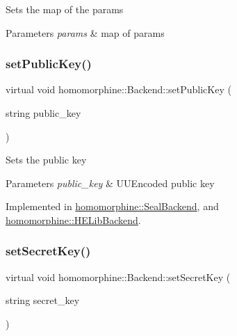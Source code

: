 Sets the map of the params


\begin{DoxyParams}{Parameters}
{\em params} & map of params \\
\hline
\end{DoxyParams}
\mbox{\label{classhomomorphine_1_1_backend_a7c1236495e4aa6481871852edfff327a}} 
\subsubsection{\texorpdfstring{setPublicKey()}{setPublicKey()}}
{\footnotesize\ttfamily virtual void homomorphine\+::\+Backend\+::set\+Public\+Key (\begin{DoxyParamCaption}\item[{string}]{public\+\_\+key }\end{DoxyParamCaption})\hspace{0.3cm}{\ttfamily [pure virtual]}}

Sets the public key


\begin{DoxyParams}{Parameters}
{\em public\+\_\+key} & U\+U\+Encoded public key \\
\hline
\end{DoxyParams}


Implemented in \mbox{\hyperlink{classhomomorphine_1_1_seal_backend_a6d34008acb06ff1d6743f9163fcd41fb}{homomorphine\+::\+Seal\+Backend}}, and \mbox{\hyperlink{classhomomorphine_1_1_h_e_lib_backend_af54dc3990d99aab69c97172d0e5b4e51}{homomorphine\+::\+H\+E\+Lib\+Backend}}.

\mbox{\label{classhomomorphine_1_1_backend_af20abcf14fae6a93c02e6470ea111123}} 
\subsubsection{\texorpdfstring{setSecretKey()}{setSecretKey()}}
{\footnotesize\ttfamily virtual void homomorphine\+::\+Backend\+::set\+Secret\+Key (\begin{DoxyParamCaption}\item[{string}]{secret\+\_\+key }\end{DoxyParamCaption})\hspace{0.3cm}{\ttfamily [pure virtual]}}

